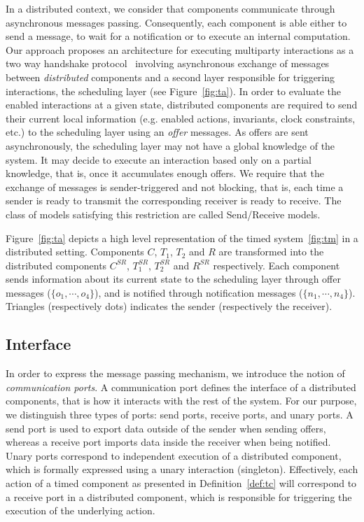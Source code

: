 In a distributed context, we consider that components communicate through asynchronous 
messages passing. Consequently, each component is able either to send a message, to wait for 
a notification or to execute an internal computation. Our approach proposes an architecture for 
executing multiparty interactions as a two way handshake 
protocol~\cite{ahlem_these,conf_free,jean} involving asynchronous 
exchange of messages between \emph{distributed} components and a second layer responsible for 
triggering interactions, the scheduling layer (see Figure~\ref{fig:ta}). 
In order to evaluate the enabled interactions at a given state, distributed components are 
required to send their current local information (e.g. enabled actions, invariants, 
clock constraints, etc.) to the scheduling layer using an \emph{offer} messages. 
As offers are sent asynchronously,  
the scheduling layer may not have a global knowledge of the system. It may decide to execute
an interaction based only on a partial knowledge, that is, once it accumulates enough offers.
We require that the exchange of messages is sender-triggered and not blocking, that is,
each time a sender is ready to transmit the corresponding receiver is ready to receive.
The class of models satisfying this restriction are called Send/Receive models.

\begin{example}
  Figure~\ref{fig:ta} depicts a high level representation of the timed system~\ref{fig:tm} in a 
  distributed setting. Components $C$, $T_1$, $T_2$ and $R$ are transformed into the distributed
  components $C^{SR}$, $T_1^{SR}$, $T_2^{SR}$ and $R^{SR}$ respectively. Each component sends 
  information about its current state to the scheduling layer through offer messages
  ($\{o_1,\cdots,o_4\}$), and is notified through notification messages ($\{n_1,\cdots,n_4\}$).
  Triangles (respectively dots) indicates the sender (respectively the receiver). 
\end{example}


\subsection{Interface}
In order to express the message passing mechanism, we introduce the notion of 
\emph{communication ports}. A communication port defines the interface of a distributed 
components, that is how it interacts with the rest of the system. For our purpose, we distinguish
three types of ports: send ports, receive ports, and unary ports.
A send port is used to export data outside of the sender when sending offers, whereas
a receive port imports data inside the receiver  
when being notified. Unary ports correspond to independent execution of a distributed 
component, which is formally expressed using a unary interaction (singleton). 
Effectively, each action of a timed component as presented in Definition~\ref{def:tc} 
will correspond to a receive port in a distributed component, which is responsible for triggering
the execution of the underlying action.

